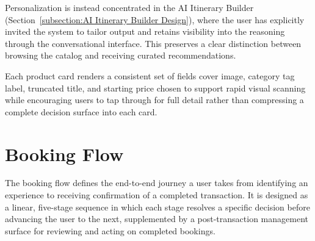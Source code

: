 Personalization is instead concentrated in the AI Itinerary Builder (Section~\ref{subsection:AI Itinerary Builder Design}), where the user has explicitly invited the system to tailor output and retains visibility into the reasoning through the conversational interface. This preserves a clear distinction between browsing the catalog and receiving curated recommendations.

Each product card renders a consistent set of fields cover image, category tag label, truncated title, and starting price chosen to support rapid visual scanning while encouraging users to tap through for full detail rather than compressing a complete decision surface into each card.
\section{Booking Flow}
\label{section:Booking Flow}
The booking flow defines the end-to-end journey a user takes from identifying an experience to receiving confirmation of a completed transaction. It is designed as a linear, five-stage sequence in which each stage resolves a specific decision before advancing the user to the next, supplemented by a post-transaction management surface for reviewing and acting on completed bookings.

